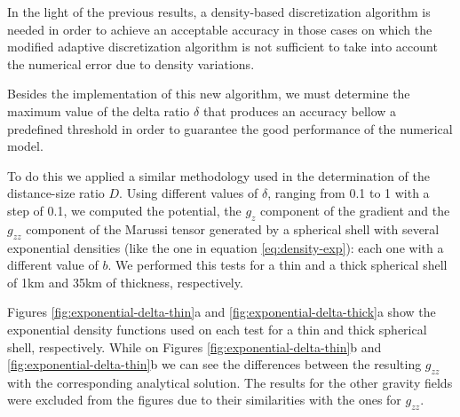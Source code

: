 \documentclass[extra]{gji}
\begin{document}
In the light of the previous results, a density-based discretization algorithm is needed in order to achieve an acceptable accuracy in those cases on which the modified adaptive discretization algorithm is not sufficient to take into account the numerical error due to density variations.

Besides the implementation of this new algorithm, we must determine the maximum value of the delta ratio $\delta$ that produces an accuracy bellow a predefined threshold in order to guarantee the good performance of the numerical model.

To do this we applied a similar methodology used in the determination of the distance-size ratio $D$.
Using different values of $\delta$, ranging from 0.1 to 1 with a step of 0.1, we computed the potential, the $g_z$ component of the gradient and the $g_{zz}$ component of the Marussi tensor generated by a spherical shell with several exponential densities (like the one in equation \ref{eq:density-exp}): each one with a different value of $b$.
We performed this tests for a thin and a thick spherical shell of 1km and 35km of thickness, respectively.

Figures \ref{fig:exponential-delta-thin}a and \ref{fig:exponential-delta-thick}a show the exponential density functions used on each test for a thin and thick spherical shell, respectively.
While on Figures \ref{fig:exponential-delta-thin}b and \ref{fig:exponential-delta-thin}b we can see the differences between the resulting $g_{zz}$ with the corresponding analytical solution.
The results for the other gravity fields were excluded from the figures due to their similarities with the ones for $g_{zz}$.
\end{document}
